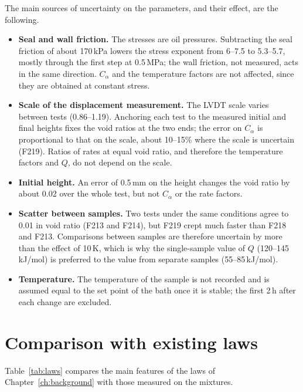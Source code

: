 The main sources of uncertainty on the parameters, and their effect, are the following.
\begin{itemize}
    \item \textbf{Seal and wall friction.} The stresses are oil pressures. Subtracting the seal friction of about 170\,kPa lowers the stress exponent from 6--7.5 to 5.3--5.7, mostly through the first step at 0.5\,MPa; the wall friction, not measured, acts in the same direction. $C_\alpha$ and the temperature factors are not affected, since they are obtained at constant stress.
    \item \textbf{Scale of the displacement measurement.} The LVDT scale varies between tests (0.86--1.19). Anchoring each test to the measured initial and final heights fixes the void ratios at the two ends; the error on $C_\alpha$ is proportional to that on the scale, about 10--15\% where the scale is uncertain (F219). Ratios of rates at equal void ratio, and therefore the temperature factors and $Q$, do not depend on the scale.
    \item \textbf{Initial height.} An error of 0.5\,mm on the height changes the void ratio by about 0.02 over the whole test, but not $C_\alpha$ or the rate factors.
    \item \textbf{Scatter between samples.} Two tests under the same conditions agree to 0.01 in void ratio (F213 and F214), but F219 crept much faster than F218 and F213. Comparisons between samples are therefore uncertain by more than the effect of 10\,K, which is why the single-sample value of $Q$ (120--145\,kJ/mol) is preferred to the value from separate samples (55--85\,kJ/mol).
    \item \textbf{Temperature.} The temperature of the sample is not recorded and is assumed equal to the set point of the bath once it is stable; the first 2\,h after each change are excluded.
\end{itemize}

\section{Comparison with existing laws}
\label{sec:comparison}

Table~\ref{tab:laws} compares the main features of the laws of Chapter~\ref{ch:background} with those measured on the mixtures.

